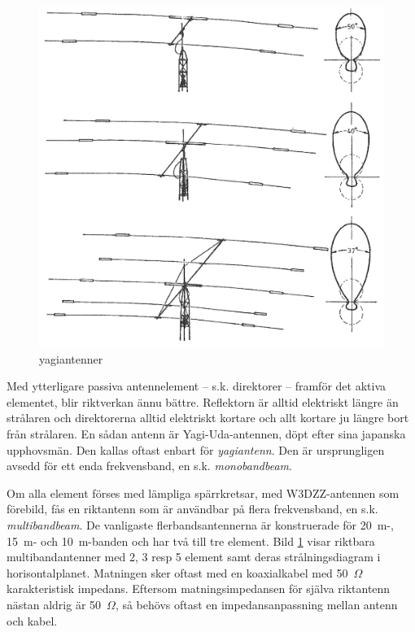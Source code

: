 \begin{figure}
  \includegraphics[width=\textwidth]{images/cropped_pdfs/bild_2_6-18.pdf}
  \caption{yagiantenner}
  \label{fig:bildII6-18}
\end{figure}

Med ytterligare passiva antennelement -- s.k. direktorer -- framför det
aktiva elementet, blir riktverkan ännu bättre.
Reflektorn är alltid elektriskt längre än strålaren och direktorerna alltid
elektriskt kortare och allt kortare ju längre bort från strålaren.
En sådan antenn är Yagi-Uda-antennen, döpt efter sina japanska upphovsmän.
Den kallas oftast enbart för \emph{yagiantenn}.
Den är ursprungligen avsedd för ett enda frekvensband, en s.k.
\emph{monobandbeam}.

Om alla element förses med lämpliga spärrkretsar, med W3DZZ-antennen som
förebild, fås en riktantenn som är användbar på flera frekvensband, en s.k.
\emph{multibandbeam}.
De vanligaste flerbandsantennerna är konstruerade för 20~m-, 15~m- och
10~m-banden och har två till tre element.
Bild \ref{fig:bildII6-18} visar riktbara multibandantenner med 2, 3 resp 5
element samt deras strålningsdiagram i horisontalplanet.
Matningen sker oftast med en koaxialkabel med 50~\(\Omega\) karakteristisk
impedans.
Eftersom matningsimpedansen för själva riktantenn nästan aldrig är
50~\(\Omega\), så behövs oftast en impedansanpassning mellan antenn och kabel.

